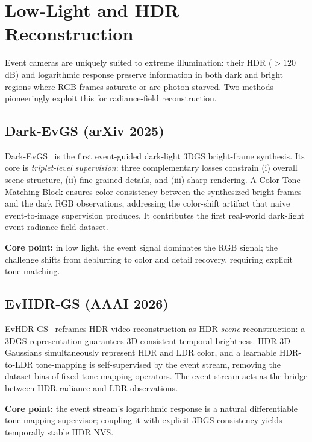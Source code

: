 \section{Low-Light and HDR Reconstruction}
\label{sec:lowlight}

Event cameras are uniquely suited to extreme illumination: their HDR ($>120$\,dB) and logarithmic response preserve information in both dark and bright regions where RGB frames saturate or are photon-starved. Two methods pioneeringly exploit this for radiance-field reconstruction.

\subsection{Dark-EvGS (arXiv 2025)}
\label{sec:lowlight:darkevgs}

Dark-EvGS~\cite{wu2025darkevgs} is the first event-guided dark-light 3DGS bright-frame synthesis. Its core is \emph{triplet-level supervision}: three complementary losses constrain (i) overall scene structure, (ii) fine-grained details, and (iii) sharp rendering. A Color Tone Matching Block ensures color consistency between the synthesized bright frames and the dark RGB observations, addressing the color-shift artifact that naive event-to-image supervision produces. It contributes the first real-world dark-light event-radiance-field dataset.

\textbf{Core point:} in low light, the event signal dominates the RGB signal; the challenge shifts from deblurring to color and detail recovery, requiring explicit tone-matching.

\subsection{EvHDR-GS (AAAI 2026)}
\label{sec:lowlight:evhdrgs}

EvHDR-GS~\cite{chen2026evhdrgs} reframes HDR video reconstruction as HDR \emph{scene} reconstruction: a 3DGS representation guarantees 3D-consistent temporal brightness. HDR 3D Gaussians simultaneously represent HDR and LDR color, and a learnable HDR-to-LDR tone-mapping is self-supervised by the event stream, removing the dataset bias of fixed tone-mapping operators. The event stream acts as the bridge between HDR radiance and LDR observations.

\textbf{Core point:} the event stream's logarithmic response is a natural differentiable tone-mapping supervisor; coupling it with explicit 3DGS consistency yields temporally stable HDR NVS.
